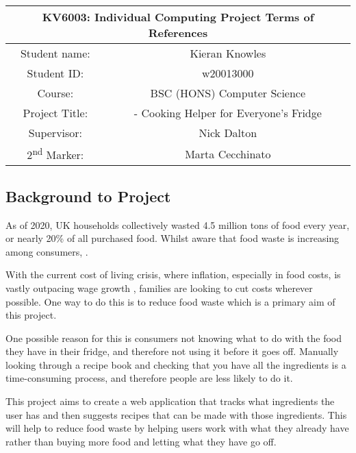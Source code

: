 \documentclass[../CHEFCookingHelperForEveryonesFridge.tex]{subfiles}
\begin{document}
\begin{table}[h!]
    \centering
    \begin{tabular}{|c|c|}
        \hline
        \multicolumn{2}{|c|}{KV6003: Individual Computing Project Terms of References} \\\hline
        Student name: & Kieran Knowles \\\hline
        Student ID: & w20013000 \\\hline
        Course: & BSC (HONS) Computer Science \\\hline
        Project Title: & \chef{} - Cooking Helper for Everyone's Fridge \\\hline
        Supervisor: & Nick Dalton \\\hline
        2\textsuperscript{nd} Marker: & Marta Cecchinato \\\hline
    \end{tabular}
\end{table}

\subsection{Background to Project}
As of 2020, UK households collectively wasted 4.5 million tons of food every year, or nearly 20\% of all purchased food.
Whilst aware that food waste is increasing among consumers,  \cite{wrap_uk_2020}.

With the current cost of living crisis, where inflation, especially in food costs, is vastly outpacing wage growth \cite{office_for_national_statistics_average_2023}
\cite{francis-devine_rising_2023}, families are looking to cut costs wherever possible. One way to do this is to reduce food waste which is a
primary aim of this project.

One possible reason for this is consumers not knowing what to do with the food they have in their fridge, and therefore not using it before it goes off.
Manually looking through a recipe book and checking that you have all the ingredients is a time-consuming process, and therefore people are less likely to do it.

This project aims to create a web application that tracks what ingredients the user has and then suggests recipes that can be made with those ingredients.
This will help to reduce food waste by helping users work with what they already have rather than buying more food and letting what they have go off.
\end{document}
